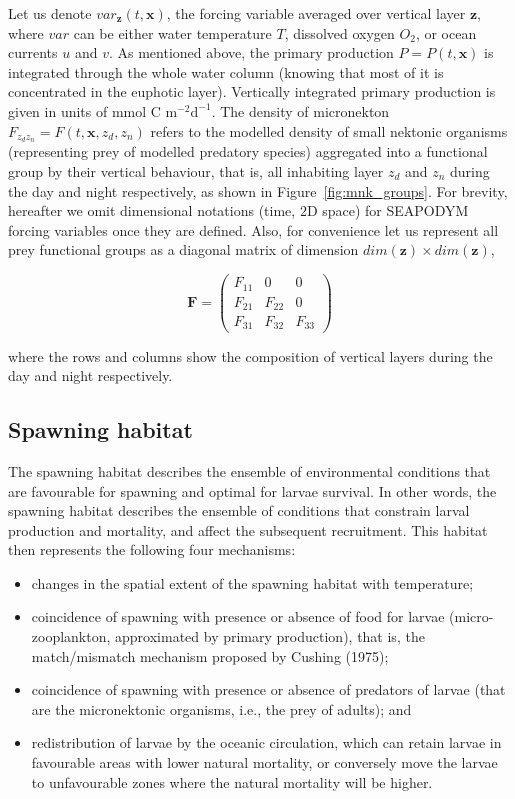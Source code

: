 Let us denote $var_{\mathbf{z}}(t,\mathbf{x})$, the forcing variable averaged over vertical layer $\mathbf{z}$, where $var$ can be either water temperature $T$, dissolved oxygen $O_2$, or ocean currents $u$ and $v$. As mentioned above, the primary production $P =P(t,\mathbf{x})$ is integrated through the whole water column (knowing that most of it is concentrated in the euphotic layer). Vertically integrated primary production is given in units of $\text{mmol C} \text{ m}^{-2} \text{d}^{-1}$. The density of micronekton $F_{z_d z_n}=F(t,\mathbf{x},z_{d},z_{n})$ refers to the modelled density of small nektonic organisms (representing prey of modelled predatory species) aggregated into a functional group by their vertical behaviour, that is, all inhabiting layer $z_d$ and $z_n$ during the day and night respectively, as shown in Figure~\ref{fig:mnk_groups}. For brevity, hereafter we omit dimensional notations (time, 2D space) for SEAPODYM forcing variables once they are defined. Also, for convenience let us represent all prey functional groups as a diagonal matrix of dimension $dim(\mathbf z) \times dim(\mathbf z)$,

\begin{equation}
 \mathbf{F} = \left( 
  \begin{array}{ccc}
	F_{11} & 0 & 0 \\
	F_{21} & F_{22} & 0 \\
	F_{31} & F_{32} & F_{33}
  \end{array} \right)
\label{eq:F}
\end{equation}

\noindent where the rows and columns show the composition of vertical layers during the day and night respectively.  

\subsection{Spawning habitat}\label{sec:spawning-habitat}
The spawning habitat describes the ensemble of environmental conditions that are favourable for spawning and optimal for larvae survival. In other words, the spawning habitat describes the ensemble of conditions that constrain larval production and mortality, and affect the subsequent recruitment. This habitat then represents the following four mechanisms:
\begin{itemize}
	\item changes in the spatial extent of the spawning habitat with temperature;
	\item coincidence of spawning with presence or absence of food for larvae (micro-zooplankton, approximated by primary production), that is, the match/mismatch mechanism proposed by Cushing (1975);
	\item coincidence of spawning with presence or absence of predators of larvae (that are the micronektonic organisms, i.e., the prey of adults); and
	\item redistribution of larvae by the oceanic circulation, which can retain larvae in favourable areas with lower natural mortality, or conversely move the larvae to unfavourable zones where the natural mortality will be higher. 
\end{itemize}

